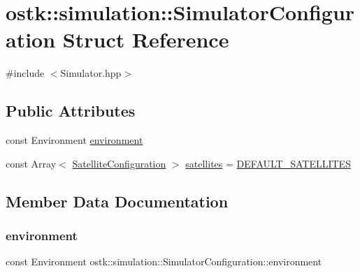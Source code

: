 \hypertarget{structostk_1_1simulation_1_1_simulator_configuration}{}\section{ostk\+:\+:simulation\+:\+:Simulator\+Configuration Struct Reference}
\label{structostk_1_1simulation_1_1_simulator_configuration}


{\ttfamily \#include $<$Simulator.\+hpp$>$}

\subsection*{Public Attributes}
\begin{DoxyCompactItemize}
\item 
const Environment \hyperlink{structostk_1_1simulation_1_1_simulator_configuration_a002747f47ff422d4be5745eeb476e8ea}{environment}
\item 
const Array$<$ \hyperlink{structostk_1_1simulation_1_1_satellite_configuration}{Satellite\+Configuration} $>$ \hyperlink{structostk_1_1simulation_1_1_simulator_configuration_aa42414403bb4d50e000ed4a78bac78b5}{satellites} = \hyperlink{_simulator_8hpp_a233d40e3dd62e2ffb9f35a635f34fd36}{D\+E\+F\+A\+U\+L\+T\+\_\+\+S\+A\+T\+E\+L\+L\+I\+T\+ES}
\end{DoxyCompactItemize}


\subsection{Member Data Documentation}
\mbox{\label{structostk_1_1simulation_1_1_simulator_configuration_a002747f47ff422d4be5745eeb476e8ea}} 
\subsubsection{\texorpdfstring{environment}{environment}}
{\footnotesize\ttfamily const Environment ostk\+::simulation\+::\+Simulator\+Configuration\+::environment}

\mbox{\label{structostk_1_1simulation_1_1_simulator_configuration_aa42414403bb4d50e000ed4a78bac78b5}} 
